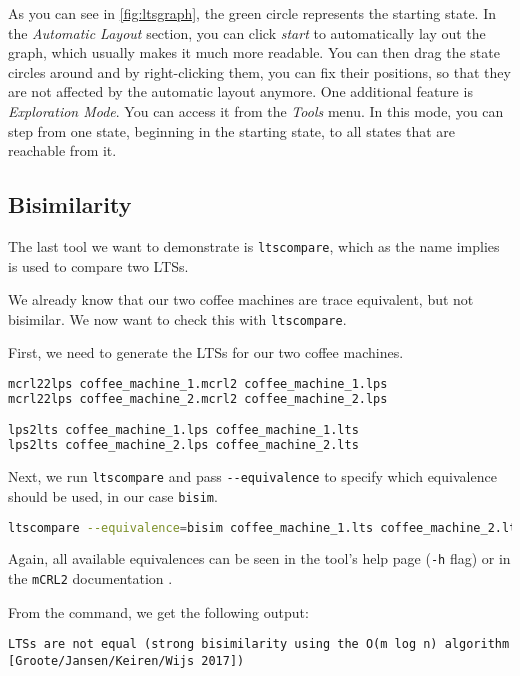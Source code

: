 \documentclass{clseminar}
\begin{document}
  As you can see in \autoref{fig:ltsgraph}, the green circle represents the starting state. In the \textit{Automatic Layout} section, you can click \textit{start} to automatically lay out the graph, which usually makes it much more readable. You can then drag the state circles around and by right-clicking them, you can fix their positions, so that they are not affected by the automatic layout anymore. One additional feature is \textit{Exploration Mode}. You can access it from the \textit{Tools} menu. In this mode, you can step from one state, beginning in the starting state, to all states that are reachable from it.

  \subsection{Bisimilarity}

  The last tool we want to demonstrate is \texttt{ltscompare}, which as the name implies is used to compare two LTSs.

  We already know that our two coffee machines are trace equivalent, but not bisimilar. We now want to check this with \texttt{ltscompare}.

  First, we need to generate the LTSs for our two coffee machines.

  \begin{lstlisting}[language=Bash]
mcrl22lps coffee_machine_1.mcrl2 coffee_machine_1.lps
mcrl22lps coffee_machine_2.mcrl2 coffee_machine_2.lps

lps2lts coffee_machine_1.lps coffee_machine_1.lts
lps2lts coffee_machine_2.lps coffee_machine_2.lts
  \end{lstlisting}

  Next, we run \texttt{ltscompare} and pass \texttt{-{}-equivalence} to specify which equivalence should be used, in our case \texttt{bisim}.

  \begin{lstlisting}[language=Bash]
ltscompare --equivalence=bisim coffee_machine_1.lts coffee_machine_2.lts
  \end{lstlisting}

  Again, all available equivalences can be seen in the tool's help page (\texttt{-h} flag) or in the \texttt{mCRL2} documentation \cite[ltscompare]{mcrl2doc}.

  From the command, we get the following output:

  \begin{lstlisting}
LTSs are not equal (strong bisimilarity using the O(m log n) algorithm [Groote/Jansen/Keiren/Wijs 2017])
  \end{lstlisting}
\end{document}
